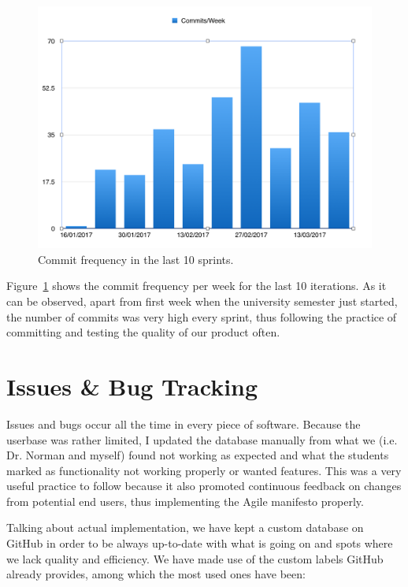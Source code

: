 \documentclass{l4proj}
\begin{document}
\begin{figure}[!ht]
    \centering
    \includegraphics[scale=0.5]{commits-week}
    \caption{Commit frequency in the last 10 sprints.}
    \label{fig:commits-week}
\end{figure}

Figure~\ref{fig:commits-week} shows the commit frequency per week for the last 10 iterations. As it can be observed, apart from first week when
the university semester just started, the number of commits was very high every sprint, thus following the practice of
committing and testing the quality of our product often.

\section{Issues \& Bug Tracking}

Issues and bugs occur all the time in every piece of software. Because the userbase was rather limited, I updated the
database manually from what we (i.e. Dr. Norman and myself) found not working as expected and what the students marked as
functionality not working properly or wanted features. This was a very useful practice to follow because it also
promoted continuous feedback on changes from potential end users, thus implementing the Agile manifesto properly.

Talking about actual implementation, we have kept a custom database on GitHub in order to be always up-to-date with what
is going on and spots where we lack quality and efficiency. We have made use of the custom labels GitHub already provides,
among which the most used ones have been:
\end{document}
